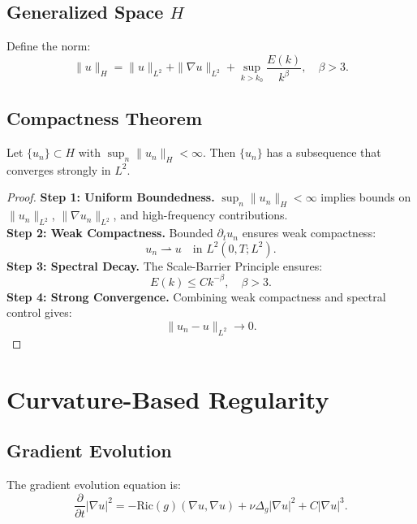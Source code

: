 \subsection{Generalized Space $H$}
Define the norm:
\begin{equation}
\|u\|_H = \|u\|_{L^2} + \|\nabla u\|_{L^2} + \sup_{k > k_0} \frac{E(k)}{k^\beta}, \quad \beta > 3.
\end{equation}

\subsection{Compactness Theorem}
\begin{theorem}
Let $\{u_n\} \subset H$ with $\sup_n \|u_n\|_H < \infty$. Then $\{u_n\}$ has a subsequence that converges strongly in $L^2$.
\end{theorem}

\begin{proof}
\textbf{Step 1: Uniform Boundedness.} $\sup_n \|u_n\|_H < \infty$ implies bounds on $\|u_n\|_{L^2}$, $\|\nabla u_n\|_{L^2}$, and high-frequency contributions.\\
\textbf{Step 2: Weak Compactness.} Bounded $\partial_t u_n$ ensures weak compactness:
\begin{equation}
u_n \rightharpoonup u \quad \text{in } L^2(0, T; L^2).
\end{equation}
\textbf{Step 3: Spectral Decay.} The Scale-Barrier Principle ensures:
\begin{equation}
E(k) \leq Ck^{-\beta}, \quad \beta > 3.
\end{equation}
\textbf{Step 4: Strong Convergence.} Combining weak compactness and spectral control gives:
\begin{equation}
\|u_n - u\|_{L^2} \to 0.
\end{equation}
\end{proof}

\section{Curvature-Based Regularity}

\subsection{Gradient Evolution}
The gradient evolution equation is:
\begin{equation}
\frac{\partial}{\partial t} |\nabla u|^2 = -\text{Ric}(g)(\nabla u, \nabla u) + \nu \Delta_g |\nabla u|^2 + C|\nabla u|^3.
\end{equation}

